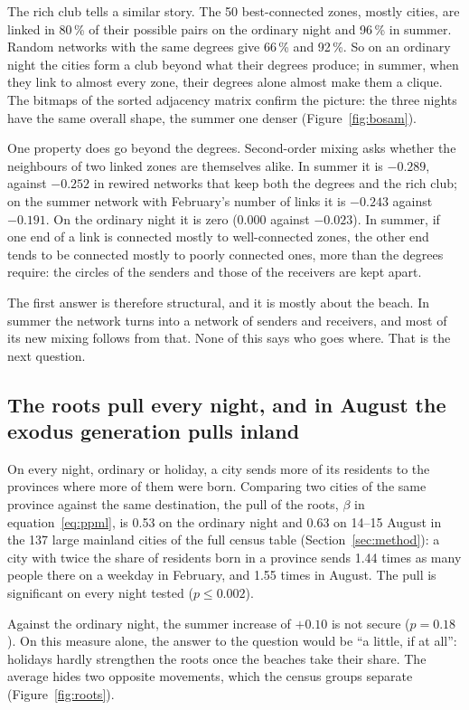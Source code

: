 The rich club tells a similar story. The 50 best-connected zones, mostly cities, are linked in 80\,\% of their possible pairs on the ordinary night and 96\,\% in summer. Random networks with the same degrees give 66\,\% and 92\,\%. So on an ordinary night the cities form a club beyond what their degrees produce; in summer, when they link to almost every zone, their degrees alone almost make them a clique. The bitmaps of the sorted adjacency matrix confirm the picture: the three nights have the same overall shape, the summer one denser (Figure~\ref{fig:bosam}).

One property does go beyond the degrees. Second-order mixing asks whether the neighbours of two linked zones are themselves alike. In summer it is $-0.289$, against $-0.252$ in rewired networks that keep both the degrees and the rich club; on the summer network with February's number of links it is $-0.243$ against $-0.191$. On the ordinary night it is zero ($0.000$ against $-0.023$). In summer, if one end of a link is connected mostly to well-connected zones, the other end tends to be connected mostly to poorly connected ones, more than the degrees require: the circles of the senders and those of the receivers are kept apart.

The first answer is therefore structural, and it is mostly about the beach. In summer the network turns into a network of senders and receivers, and most of its new mixing follows from that. None of this says who goes where. That is the next question.

\subsection{The roots pull every night, and in August the exodus generation pulls inland}\label{sec:res-roots}

On every night, ordinary or holiday, a city sends more of its residents to the provinces where more of them were born. Comparing two cities of the same province against the same destination, the pull of the roots, $\beta$ in equation~\eqref{eq:ppml}, is 0.53 on the ordinary night and 0.63 on 14--15 August in the 137 large mainland cities of the full census table (Section~\ref{sec:method}): a city with twice the share of residents born in a province sends 1.44 times as many people there on a weekday in February, and 1.55 times in August. The pull is significant on every night tested ($p\le0.002$).

Against the ordinary night, the summer increase of $+0.10$ is not secure ($p=0.18$). On this measure alone, the answer to the question would be ``a little, if at all'': holidays hardly strengthen the roots once the beaches take their share. The average hides two opposite movements, which the census groups separate (Figure~\ref{fig:roots}).

